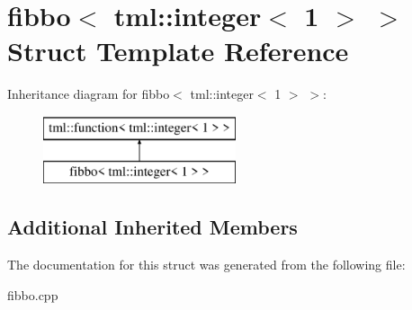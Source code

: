 \hypertarget{structfibbo_3_01tml_1_1integer_3_011_01_4_01_4}{\section{fibbo$<$ tml\+:\+:integer$<$ 1 $>$ $>$ Struct Template Reference}
\label{structfibbo_3_01tml_1_1integer_3_011_01_4_01_4}
}
Inheritance diagram for fibbo$<$ tml\+:\+:integer$<$ 1 $>$ $>$\+:\begin{figure}[H]
\begin{center}
\leavevmode
\includegraphics[height=2.000000cm]{structfibbo_3_01tml_1_1integer_3_011_01_4_01_4}
\end{center}
\end{figure}
\subsection*{Additional Inherited Members}


The documentation for this struct was generated from the following file\+:\begin{DoxyCompactItemize}
\item 
fibbo.\+cpp\end{DoxyCompactItemize}
